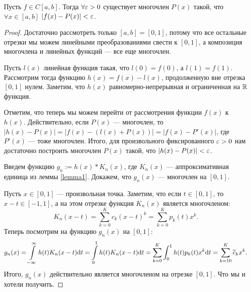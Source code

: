 \begin{Theorem}
Пусть $f \in C[a, b]$. Тогда $\forall \varepsilon > 0$ существует многочлен $P(x)$ такой, что \\$\forall x \in [a, b]$ $|f(x) - P(x)| < \varepsilon$. 
\end{Theorem}
\begin{proof}
Достаточно рассмотреть только $[a, b] = [0, 1]$, потому что все остальные отрезки мы можем линейными преобразованиями свести к $[0, 1]$, а композиция многочлена и линейных функций --- все еще многочлен.

Пусть $l(x)$ линейная функция такая, что $l(0) = f(0)$, а $l(1) = f(1)$. Рассмотрим тогда функцию $h(x) = f(x) - l(x)$, продолженную вне отрезка $[0, 1]$ нулем. Заметим, что $h(x)$ равномерно-непрерывная и ограниченная на $\mathbb{R}$ функция.

Отметим, что теперь мы можем перейти от рассмотрения функции $f(x)$ к $h(x)$. Действительно, если $P(x)$ --- многочлен, то $|h(x) - P(x)| = |f(x) - (l(x) + P(x))| = |f(x) - P'(x)|$, где $P'(x)$ --- тоже многочлен. Итого, для произвольного фиксированного $\varepsilon > 0$ нам достаточно построить многочлен $P(x)$ такой, что $|h(x) - P(x)| < \varepsilon$.

Введем функцию $g_n := h(x) * K_n(x)$, где $K_n(x)$ --- аппроксимативная единица из леммы \ref{lemma1}. Докажем, что $g_n(x)$ --- многочлен на $[0, 1]$. 

Пусть $x \in [0, 1]$ --- произвольная точка. Заметим, что если $t \in [0, 1]$, то $x - t \in [-1, 1]$, а на этом отрезке функция $K_n(x)$ является многочленом: 
$$
K_n(x - t) = \sum\limits_{k = 0}^{K}c_k(x - t)^k = \sum\limits_{k = 0}^K p_k(t)x^k.
$$
Теперь посмотрим на функцию $g_n(x)$ на $[0, 1]$:
$$
g_n(x) = \int\limits_{-\infty}^{\infty}h(t)K_n(x - t)\mathrm{d} t = \int\limits_{0}^1h(t)K_n(x - t)\mathrm{d} t = \sum\limits_{k = 0}^K \int_0^1 h(t)p_k (t) x^k \mathrm{d} t = \sum\limits_{k = 10}^K \widetilde{c}_k x^k.
$$
Итого, $g_n(x)$ действительно является многочленом на отрезке $[0, 1]$. Что мы и хотели получить.
\end{proof}

